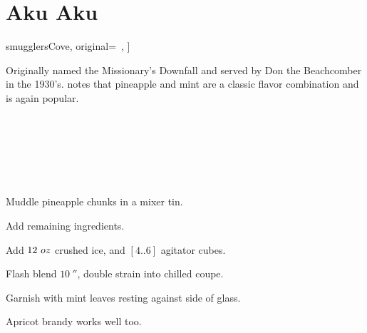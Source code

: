 \section[Aku Aku]{Aku Aku}

\begin{recipestats}[
        servings=1,
        preptime=5~\minute,
        source=\citeauthor{smugglersCove}~\cite[p.~39]{smugglersCove},
        original=\citeauthor{traderVicsGuide}~\cite{traderVicsGuide},
    ]
\end{recipestats}

\begin{recipeabstract}
    Originally named the Missionary's Downfall and served by Don the
    Beachcomber in the 1930's\cite{smugglersCove}.
    \citeauthor{smugglersCove} notes that pineapple and mint are a classic
    flavor combination and is again popular.
\end{recipeabstract}

\begin{ingredientcolumns}[1]
    \begin{ingredientblock}
        \\
        \\
        \\
        \\
        \\
    \end{ingredientblock}
\end{ingredientcolumns}

\begin{preparation}
\item Muddle pineapple chunks in a mixer tin.
\item Add remaining ingredients.
\item Add $12~oz$ crushed ice, and $[4..6]$ agitator cubes.
\item Flash blend $10~\second$, double strain into chilled coupe.
\item Garnish with mint leaves resting against side of glass.
\end{preparation}

\begin{variation}
\item Apricot brandy works well too.
\end{variation}


\recipeend%
